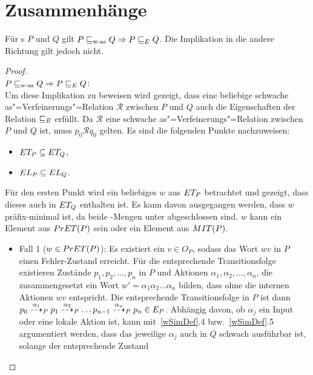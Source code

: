 \section{Zusammenhänge}

\begin{Satz}
  \label{ZusammenhFehlerSatz}
  Für \MEIO{}s $P$ und $Q$ gilt $P\sqsubseteq _{\mathrm{w}\text{-}\mathrm{as}} Q\Rightarrow P \sqsubseteq  _E Q$. Die
  Implikation in die andere Richtung gilt jedoch nicht.
\end{Satz}
\begin{proof}\mbox{}\\
  $P\sqsubseteq _{\mathrm{w}\text{-}\mathrm{as}} Q\Rightarrow P \sqsubseteq  _E Q$:\\
  Um diese Implikation zu beweisen wird gezeigt, dass eine beliebige
  schwache as"=Verfeinerungs"=Relation $\mathcal{R}$ zwischen $P$ und $Q$ auch
  die Eigenschaften der Relation $ \sqsubseteq  _E$ erfüllt. Da $\mathcal{R}$ eine
  schwache as"=Verfeinerungs"=Relation zwischen $P$ und $Q$ ist, muss $p_0
  \mathcal{R} q_0$ gelten. Es sind die folgenden Punkte nachzuweisen:
  \begin{itemize}
    \item $ET _P \subseteq ET _Q$,
    \item $EL _P \subseteq EL _Q$.
  \end{itemize}
  Für den ersten Punkt wird ein beliebiges $w$ aus $ET _P$ betrachtet und
  gezeigt, dass dieses auch in $ET _Q$ enthalten ist. Es kann davon
  ausgegangen werden, dass $w$ präfix-minimal ist, da beide \ET{}-Mengen unter
  \cont{} abgeschlossen sind. $w$ kann ein Element aus $PrET (P)$ sein oder
  ein Element aus $MIT (P)$.
  \begin{itemize}
    \item Fall 1 ($w\in PrET (P)$): Es existiert ein $v\in O_P$, sodass das
      Wort $wv$ in $P$ einen Fehler-Zustand erreicht. Für die entsprechende
      Transitionsfolge existieren Zustände $p_1, p_2,\dots , p_n$ in $P$ und
      Aktionen $\alpha _1, \alpha _2,\dots , \alpha _n$, die zusammengesetzt
      ein Wort $w'=\alpha _1 \alpha _2 \dots \alpha _n$ bilden, dass ohne die
      internen Aktionen $wv$ entspricht. Die entsprechende Transitionsfolge in
      $P$ ist dann $p_0 \may[\alpha _1]_P p_1 \may[\alpha _2]_P \dots p_{n-1}
      \may[\alpha _n]_P p_n \in E_P$. Abhängig davon, ob $\alpha _j$ ein Input
      oder eine lokale Aktion ist, kann mit~\ref{wSimDef}.4
      bzw.~\ref{wSimDef}.5 argumentiert werden, dass das jeweilige $\alpha _j$
      auch in $Q$ schwach ausführbar ist, solange der entsprechende Zustand

\end{itemize}
\end{proof}
